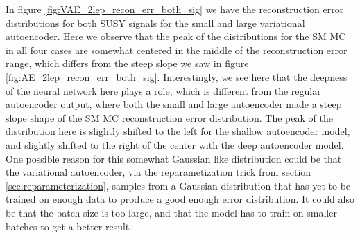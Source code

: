 In figure \ref{fig:VAE_2lep_recon_err_both_sig} we have the reconstruction error distributions 
for both SUSY signals for the small and large variational autoencoder. Here we observe that the 
peak of the distributions for the SM MC in all four cases are somewhat centered in the middle 
of the reconstruction error range, which differs from the steep slope we saw in figure
\ref{fig:AE_2lep_recon_err_both_sig}. Interestingly, we see here that the deepness of the neural 
network here plays a role, which is different from the regular autoencoder output, where both 
the small and large autoencoder made a steep slope shape of the SM MC reconstruction error 
distribution. The peak of the distribution here is slightly shifted to the left for the shallow 
autoencoder model, and slightly shifted to the right of the center with the deep autoencoder 
model. One possible reason for this somewhat Gaussian like distribution could be that the 
variational autoencoder, via the reparametization trick from section \ref{sec:reparameterization}, 
samples from a Gaussian distribution that has yet to be trained on enough data to produce a 
good enough error distribution. It could also be that the batch size is too large, and that 
the model has to train on smaller batches to get a better result. \par 

